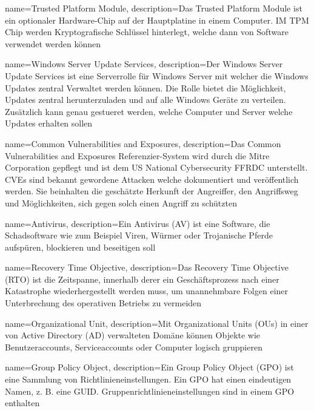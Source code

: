 {
    name=Trusted Platform Module,
    description={Das Trusted Platform Module ist ein optionaler Hardware-Chip auf der Hauptplatine in einem Computer. IM TPM Chip werden Kryptografische Schlüssel hinterlegt, welche dann von Software verwendet werden können}
}

{
    name=Windows Server Update Services,
    description={Der Windows Server Update Services ist eine Serverrolle für Windows Server mit welcher die Windows Updates zentral Verwaltet werden können. Die Rolle bietet die Möglichkeit, Updates zentral herunterzuladen und auf alle Windows Geräte zu verteilen. Zusätzlich kann genau gestueret werden, welche Computer und Server welche Updates erhalten sollen}
}

{
    name=Common Vulnerabilities and Exposures,
    description={Das Common Vulnerabilities and Exposures Referenzier-System wird durch die Mitre Corporation gepflegt und ist dem US National Cybersecurity FFRDC unterstellt. CVEs sind bekannt gewordene Attacken welche dokumentiert und veröffentlich werden. Sie beinhalten die geschätzte Herkunft der Angreiffer, den Angriffsweg und Möglichkeiten, sich gegen solch einen Angriff zu schützten}
}

{
    name=Antivirus,
    description={Ein Antivirus (AV) ist eine Software, die Schadsoftware wie zum Beispiel Viren, Würmer oder Trojanische Pferde aufspüren, blockieren und beseitigen soll}
}

{
    name=Recovery Time Objective,
    description={Das Recovery Time Objective (RTO) ist die Zeitspanne, innerhalb derer ein Geschäftsprozess nach einer Katastrophe wiederhergestellt werden muss, um unannehmbare Folgen einer Unterbrechung des operativen Betriebs zu vermeiden}
}

{
    name=Organizational Unit,
    description={Mit Organizational Units (OUs) in einer von Active Directory (AD) verwalteten Domäne können Objekte wie Benutzeraccounts, Serviceaccounts oder Computer logisch gruppieren}
}

{
    name=Group Policy Object,
    description={Ein Group Policy Object (GPO) ist eine Sammlung von Richtlinieneinstellungen. Ein GPO hat einen eindeutigen Namen, z. B. eine GUID. Gruppenrichtlinieneinstellungen sind in einem GPO enthalten}
}

